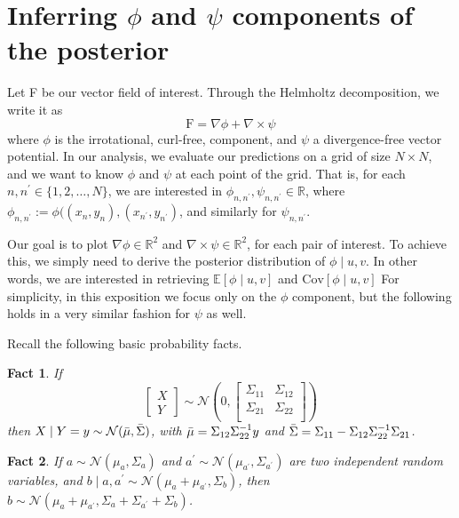 \documentclass[11pt,a4paper]{article}
\newtheorem{fact}{Fact}
\begin{document}
\section*{Inferring $\phi$ and $\psi$ components of the posterior}

Let F be our vector field of interest. Through the Helmholtz decomposition, we write it as 
$$
\text{F} = \nabla \phi + \nabla \times \psi
$$
where $\phi$ is the irrotational, curl-free, component, and $\psi$ a divergence-free vector potential. In our analysis, we evaluate our predictions on a grid of size $N \times N$, and we want to know $\phi$ and $\psi$ at each point of the grid. That is, for each $n, n^\prime \in \{1,2,\ldots,N\}$, we are interested in $\phi_{n,n^\prime}, \psi_{n,n^\prime} \in \mathbb{R}$, where $\phi_{n,n^\prime} := \phi((x_n,y_n), (x_{n^\prime},y_{n^\prime})$, and similarly for $\psi_{n,n^\prime}$.

Our goal is to plot $\nabla \phi \in \mathbb{R}^2$ and $\nabla \times \psi \in \mathbb{R}^2$, for each pair of interest. To achieve this, we simply need to derive the posterior distribution of $\phi \mid u,v$. In other words, we are interested in retrieving $\mathbb{E}[\phi \mid u,v]$ and $\text{Cov}[\phi \mid u,v]$ For simplicity, in this exposition we focus only on the $\phi$ component, but the following holds in a very similar fashion for $\psi$ as well. \newline

Recall the following basic probability facts.
\begin{fact}
If 
$$
\begin{bmatrix}
X \\ Y
\end{bmatrix}
\sim \mathcal{N}\left(0,
\begin{bmatrix}
\Sigma_{11} & \Sigma_{12} \\
\Sigma_{21} & \Sigma_{22} \\
\end{bmatrix}
\right)
$$
then $X \mid Y = y \sim \mathcal{N}(\Bar{\mu}, \Bar{\Sigma})$, with $\Bar{\mu} = \Sigma_{12} \Sigma_{22}^{-1}y$ and $\Bar{\Sigma} = \Sigma_{11} - \Sigma_{12} \Sigma_{22}^{-1}\Sigma_{21}$.

\end{fact}

\begin{fact}
If $a \sim \mathcal{N}(\mu_a, \Sigma_a)$ and $a^{\prime} \sim \mathcal{N}(\mu_{a^{\prime}}, \Sigma_{a^{\prime}})$ are two independent random variables, and $b \mid a, a^{\prime} \sim \mathcal{N}(\mu_a + \mu_{a^{\prime}}, \Sigma_b)$, then $b \sim \mathcal{N}(\mu_a + \mu_{a^{\prime}}, \Sigma_a + \Sigma_{a^{\prime}} + \Sigma_b)$.
\end{fact}
\end{document}
